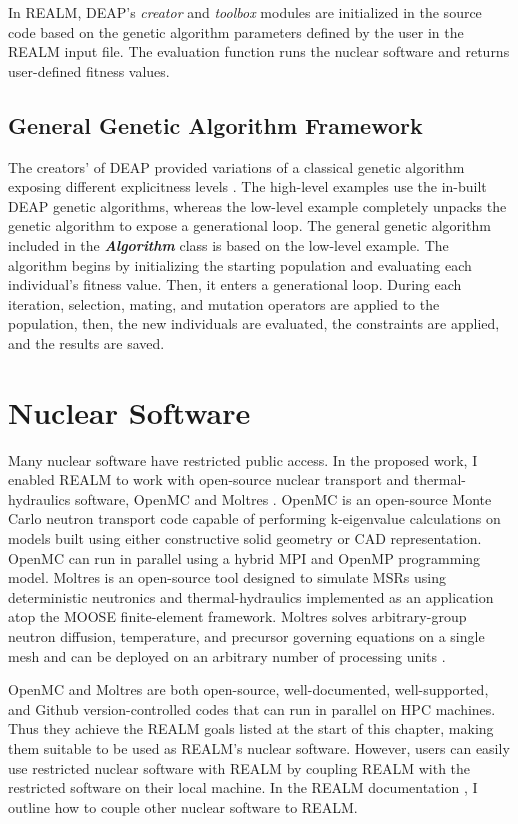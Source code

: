 In REALM, DEAP's \textit{creator} and \textit{toolbox} modules are initialized 
in the source code based on the genetic algorithm parameters defined by the user 
in the REALM input file. 
The evaluation function runs the nuclear software and returns user-defined 
fitness values. 

\subsection{General Genetic Algorithm Framework}
The creators' of DEAP provided variations of a classical genetic algorithm 
exposing different explicitness levels \cite{fortin_deap_2012}. 
The high-level examples use the in-built DEAP genetic algorithms, 
whereas the low-level example completely unpacks the genetic algorithm to expose 
a generational loop. 
The general genetic algorithm included in the \textbf{\textit{Algorithm}} class 
is based on the low-level example. 
The algorithm begins by initializing the starting population and evaluating 
each individual's fitness value. 
Then, it enters a generational loop. 
During each iteration, selection, mating, and mutation operators are applied to 
the population, then, the new individuals are evaluated, the constraints are 
applied, and the results are saved.


\section{Nuclear Software}
Many nuclear software have restricted public access. 
In the proposed work, I enabled \gls{REALM} to work with open-source nuclear 
transport and thermal-hydraulics software, OpenMC \cite{romano_openmc_2013} 
and Moltres \cite{lindsay_introduction_2018}.  
OpenMC is an open-source Monte Carlo neutron transport code capable of 
performing k-eigenvalue calculations on models built using either constructive 
solid geometry or CAD representation. 
OpenMC can run in parallel using a hybrid \gls{MPI} and OpenMP programming model. 
Moltres is an open-source tool designed to simulate \glspl{MSR} using 
deterministic neutronics and thermal-hydraulics implemented as an application 
atop the \gls{MOOSE} finite-element framework.  
Moltres solves arbitrary-group neutron diffusion, temperature, and precursor 
governing equations on a single mesh and can be deployed on an arbitrary number 
of processing units \cite{lindsay_introduction_2018}.

OpenMC and Moltres are both open-source, well-documented, well-supported, and 
Github version-controlled codes that can run in parallel on \gls{HPC} machines.
Thus they achieve the \gls{REALM} goals listed at the start of this chapter, 
making them suitable to be used as \gls{REALM}'s nuclear software.
However, users can easily use restricted nuclear software with \gls{REALM} 
by coupling \gls{REALM} with the restricted software on their local machine. 
In the REALM documentation \cite{chee_arfcrealm_2021}, I outline how to couple 
other nuclear software to REALM. 


